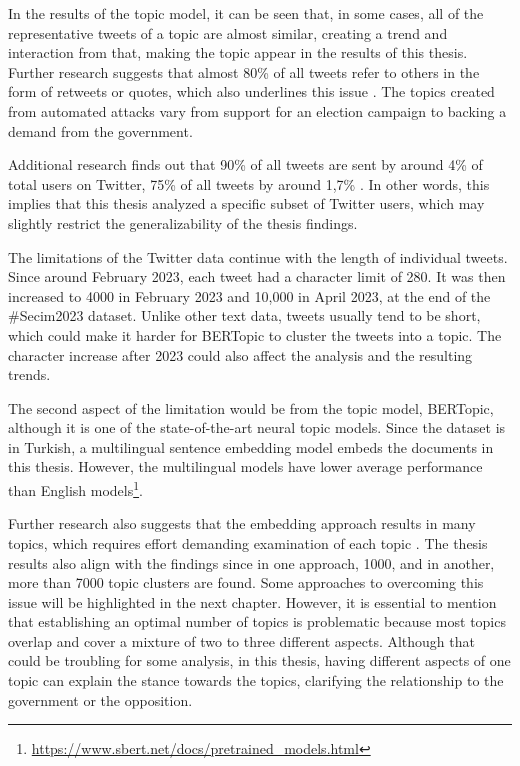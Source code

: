 In the results of the topic model, it can be seen that, in some cases, all of the representative tweets of 
a topic are almost similar, creating a trend and interaction from that, making the topic appear in the 
results of this thesis. Further research suggests that almost 80\% of all tweets refer to others in the 
form of retweets or quotes, which also underlines this issue 
\parencite{pfeffer_twitter_24_Hours_just_another_day_2023}. The topics created from automated attacks 
vary from support for an election campaign to backing a demand from the government.

Additional research finds out that 90\% of all tweets are sent by around 4\% of total users on Twitter, 
75\% of all tweets by around 1,7\% \parencite{pfeffer_twitter_24_Hours_just_another_day_2023}. 
In other words, this implies that this thesis analyzed a specific subset of Twitter users, which may 
slightly restrict the generalizability of the thesis findings.

The limitations of the Twitter data continue with the length of individual tweets. Since around February 
2023, each tweet had a character limit of 280. It was then increased to 4000 in February 2023 and 10,000 
in April 2023, at the end of the \#Secim2023 dataset. Unlike other text data, tweets usually tend to be 
short, which could make it harder for BERTopic to cluster the tweets into a topic. The character increase 
after 2023 could also affect the analysis and the resulting trends.

The second aspect of the limitation would be from the topic model, BERTopic, although it is one of the 
state-of-the-art neural topic models. Since the dataset is in Turkish, a multilingual sentence embedding 
model embeds the documents in this thesis. However, the multilingual models have lower average performance 
than English models\footnote{\url{https://www.sbert.net/docs/pretrained_models.html}}. 

Further research also suggests that the embedding approach results in many topics, which requires effort 
demanding examination of each topic \parencite{topic_model_comparison_bertopic_2022}. The thesis results 
also align with the findings since in one approach, 1000, and in another, more than 7000 topic clusters 
are found. Some approaches to overcoming this issue will be highlighted in the next chapter. However, it 
is essential to mention that establishing an optimal number of topics is problematic because most topics 
overlap and cover a mixture of two to three different aspects. Although that could be troubling for some 
analysis, in this thesis, having different aspects of one topic can explain the stance towards the topics, 
clarifying the relationship to the government or the opposition.

